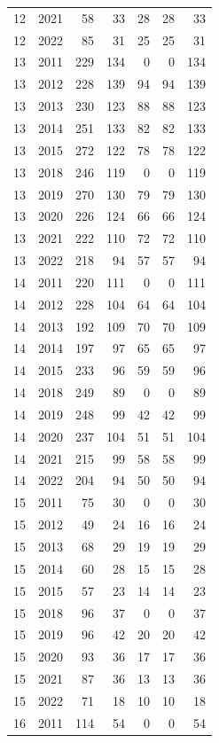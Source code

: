\begin{longtable}{llrrrrr}
12 & 2021 & 58 & 33 & 28 & 28 & 33 \\
12 & 2022 & 85 & 31 & 25 & 25 & 31 \\
13 & 2011 & 229 & 134 & 0 & 0 & 134 \\
13 & 2012 & 228 & 139 & 94 & 94 & 139 \\
13 & 2013 & 230 & 123 & 88 & 88 & 123 \\
13 & 2014 & 251 & 133 & 82 & 82 & 133 \\
13 & 2015 & 272 & 122 & 78 & 78 & 122 \\
13 & 2018 & 246 & 119 & 0 & 0 & 119 \\
13 & 2019 & 270 & 130 & 79 & 79 & 130 \\
13 & 2020 & 226 & 124 & 66 & 66 & 124 \\
13 & 2021 & 222 & 110 & 72 & 72 & 110 \\
13 & 2022 & 218 & 94 & 57 & 57 & 94 \\
14 & 2011 & 220 & 111 & 0 & 0 & 111 \\
14 & 2012 & 228 & 104 & 64 & 64 & 104 \\
14 & 2013 & 192 & 109 & 70 & 70 & 109 \\
14 & 2014 & 197 & 97 & 65 & 65 & 97 \\
14 & 2015 & 233 & 96 & 59 & 59 & 96 \\
14 & 2018 & 249 & 89 & 0 & 0 & 89 \\
14 & 2019 & 248 & 99 & 42 & 42 & 99 \\
14 & 2020 & 237 & 104 & 51 & 51 & 104 \\
14 & 2021 & 215 & 99 & 58 & 58 & 99 \\
14 & 2022 & 204 & 94 & 50 & 50 & 94 \\
15 & 2011 & 75 & 30 & 0 & 0 & 30 \\
15 & 2012 & 49 & 24 & 16 & 16 & 24 \\
15 & 2013 & 68 & 29 & 19 & 19 & 29 \\
15 & 2014 & 60 & 28 & 15 & 15 & 28 \\
15 & 2015 & 57 & 23 & 14 & 14 & 23 \\
15 & 2018 & 96 & 37 & 0 & 0 & 37 \\
15 & 2019 & 96 & 42 & 20 & 20 & 42 \\
15 & 2020 & 93 & 36 & 17 & 17 & 36 \\
15 & 2021 & 87 & 36 & 13 & 13 & 36 \\
15 & 2022 & 71 & 18 & 10 & 10 & 18 \\
16 & 2011 & 114 & 54 & 0 & 0 & 54 \\

\end{longtable}
